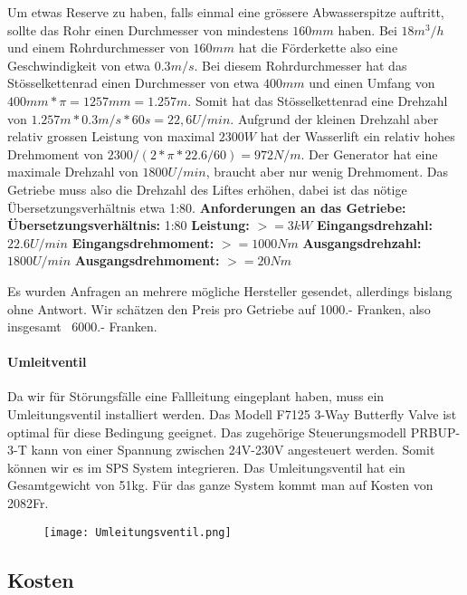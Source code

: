 Um etwas Reserve zu haben, falls einmal eine grössere Abwasserspitze auftritt, sollte das Rohr einen Durchmesser von mindestens \(160mm\) haben. Bei \(18 m^3 /h \) und einem Rohrdurchmesser von \(160mm\) hat die Förderkette also eine Geschwindigkeit von etwa \(0.3 m/s \). Bei diesem Rohrdurchmesser hat das Stösselkettenrad einen Durchmesser von etwa \(400mm\)\cite{schrage} und einen Umfang von \(400mm * \pi = 1257mm = 1.257m\). Somit hat das Stösselkettenrad eine Drehzahl von \(1.257m * 0.3 m/s * 60s = 22,6 U/min\). Aufgrund der kleinen Drehzahl aber relativ grossen Leistung von maximal \(2300 W\) hat der Wasserlift ein relativ hohes Drehmoment von \( 2300 /(2 * \pi * 22.6/ 60) = 972 N/m\). Der Generator hat eine maximale Drehzahl von \(1800 U/min\), braucht aber nur wenig Drehmoment. Das Getriebe muss also die Drehzahl des Liftes erhöhen, dabei ist das nötige Übersetzungsverhältnis etwa 1:80. 
\textbf{Anforderungen an das Getriebe:}				\newline
\textbf{Übersetzungsverhältnis:}	1:80			\newline
\textbf{Leistung:}					\(>=3 kW\)		\newline
\textbf{Eingangsdrehzahl:}			\(22.6 U/min\)	\newline
\textbf{Eingangsdrehmoment:}		\(>=1000 Nm\)	\newline
\textbf{Ausgangsdrehzahl:}			\(1800 U/min\)	\newline
\textbf{Ausgangsdrehmoment:}		\(>= 20 Nm\)	\newline

Es wurden Anfragen an mehrere mögliche Hersteller gesendet, allerdings bislang ohne Antwort. Wir schätzen den Preis pro Getriebe auf 1000.- Franken, also insgesamt ~6000.- Franken.

\paragraph{Umleitventil}

Da wir für Störungsfälle eine Fallleitung eingeplant haben, muss ein Umleitungsventil installiert werden. Das Modell F7125 3-Way Butterfly Valve ist optimal für diese Bedingung geeignet. Das zugehörige Steuerungsmodell PRBUP-3-T kann von einer Spannung zwischen 24V-230V angesteuert werden. Somit können wir es im SPS System integrieren. Das Umleitungsventil hat ein Gesamtgewicht von 51\si{kg}. Für das ganze System kommt man auf Kosten von 2082\si{Fr}.

 \begin{figure} [H]
	\centering
	\texttt{[image: Umleitungsventil.png]}
	\label{fig:Umleitungsventil}
\end{figure}


\cite{Belimo}



\subsection{Kosten}

